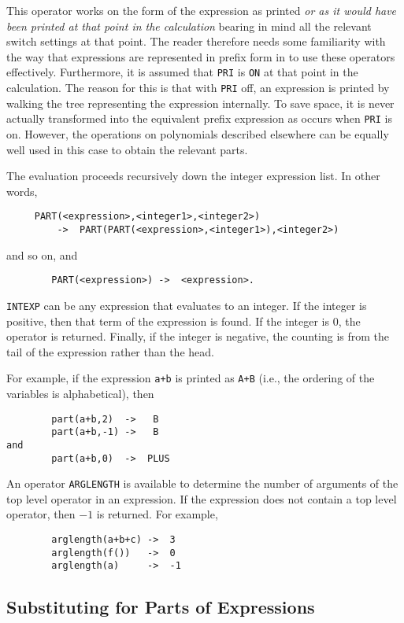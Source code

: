 This operator works on the form of the expression as printed {\em or as it
would have been printed at that point in the calculation\/} bearing in mind
all the relevant switch settings at that point.  The reader therefore
needs some familiarity with the way that expressions are represented in
prefix form in {\REDUCE} to use these operators effectively.  Furthermore,
it is assumed that {\tt PRI} is {\tt ON} at that point in the calculation.
The reason for this is that with {\tt PRI} off, an expression is printed
by walking the tree representing the expression internally.  To save
space, it is never actually transformed into the equivalent prefix
expression as occurs when {\tt PRI} is on.  However, the operations on
polynomials described elsewhere can be equally well used in this case to
obtain the relevant parts.

The evaluation proceeds recursively down the integer expression list. In
other words,
\begin{verbatim}
     PART(<expression>,<integer1>,<integer2>)
         ->  PART(PART(<expression>,<integer1>),<integer2>)
\end{verbatim}
 and so on, and
\begin{verbatim}
        PART(<expression>) ->  <expression>.
\end{verbatim}
{\tt INTEXP} can be any expression that evaluates to an integer.  If the
integer is positive, then that term of the expression is found.  If the
integer is 0, the operator is returned.  Finally, if the integer is
negative, the counting is from the tail of the expression rather than the
head.

For example, if the expression {\tt a+b} is printed as {\tt A+B} (i.e.,
the ordering of the variables is alphabetical), then
\begin{verbatim}
        part(a+b,2)  ->   B
        part(a+b,-1) ->   B
and
        part(a+b,0)  ->  PLUS
\end{verbatim}
An operator {\tt ARGLENGTH} is available to determine
the number of arguments of the top level operator in an expression.  If
the expression does not contain a top level operator, then $-1$ is returned.
For example,
\begin{verbatim}
        arglength(a+b+c) ->  3
        arglength(f())   ->  0
        arglength(a)     ->  -1
\end{verbatim}

\subsection{Substituting for Parts of Expressions}

